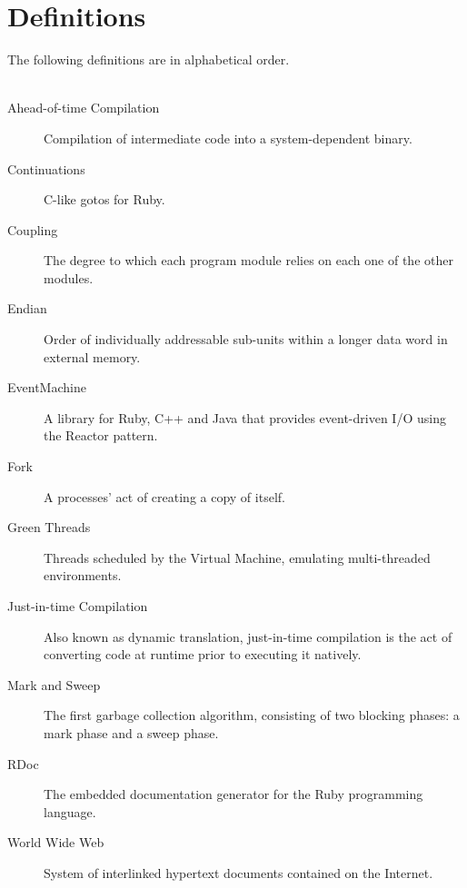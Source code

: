 \chapter*{Definitions} %
\label{cha:definitions}
The following definitions are in alphabetical order.\\\\

\begin{description}
  \item[Ahead-of-time Compilation] Compilation of intermediate code into a system-dependent binary.
  \item[Continuations] C-like gotos for Ruby.
  \item[Coupling] The degree to which each program module relies on each one of the other modules.
  \item[Endian] Order of individually addressable sub-units within a longer data word in external memory.
  \item[EventMachine] A library for Ruby, C++ and Java that provides event-driven I/O using the Reactor pattern.
  \item[Fork] A processes' act of creating a copy of itself.
  \item[Green Threads] Threads scheduled by the Virtual Machine, emulating multi-threaded environments.
  \item[Just-in-time Compilation] Also known as dynamic translation, just-in-time compilation is the act of converting code at runtime prior to executing it natively.
  \item[Mark and Sweep] The first garbage collection algorithm, consisting of two blocking phases: a mark phase and a sweep phase.
  \item[RDoc] The embedded documentation generator for the Ruby programming language.
  \item[World Wide Web] System of interlinked hypertext documents contained on the Internet.
\end{description}

